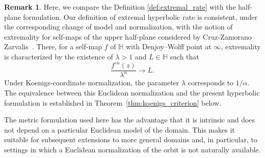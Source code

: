 \documentclass[12pt]{amsart}
\numberwithin{equation}{section}
\theoremstyle{plain}
\theoremstyle{definition}
\newtheorem{remark}[equation]{Remark}
\begin{document}
\begin{remark}
\label{rem:cruz_comparison}
Here, we compare the Definition \eqref{def:extremal_rate} with the half-plane formulation.
Our definition of extremal hyperbolic rate is consistent, under the
corresponding change of model and normalization, with the notion of
extremality for self-maps of the upper half-plane considered by
Cruz-Zamorano--Zarvalis~\cite[Definition~3.3]{cruz}. There, for a
self-map $f$ of $\mathbb{H}$ with Denjoy--Wolff point at $\infty$,
extremality is characterized by the existence of $\lambda>1$ and
$L\in\mathbb{H}$ such that
\begin{equation*}
\frac{f^{\circ n}(z)}{\lambda^n}\longrightarrow L.
\end{equation*}
Under Koenigs-coordinate normalization, the parameter $\lambda$
corresponds to $1/\alpha$. The equivalence between this Euclidean normalization and the present hyperbolic formulation is established
in Theorem~\ref{thm:koenigs_criterion} below.

The metric formulation used here has the advantage that it is
intrinsic and does not depend on a particular Euclidean model of the
domain. This makes it suitable for subsequent extensions to more
general domains and, in particular, to settings in which a Euclidean
normalization of the orbit is not naturally available.
\end{remark}
\end{document}

